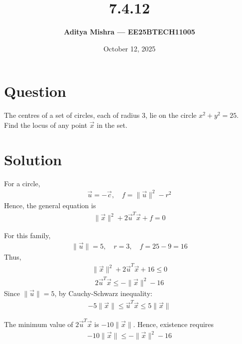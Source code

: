 \documentclass[a4paper,12pt]{article}
\title{\textbf{7.4.12}}
\author{\textbf{Aditya Mishra — EE25BTECH11005}}
\date{October 12, 2025}
\begin{document}
\maketitle

\section*{Question}
The centres of a set of circles, each of radius \(3\), lie on the circle \(x^2 + y^2 = 25\).  
Find the locus of any point \(\vec{x}\) in the set.

\section*{Solution}

For a circle,
\begin{align}
\vec{u} = -\vec{c}, \quad f = \|\vec{u}\|^2 - r^2
\end{align}
Hence, the general equation is
\begin{align}
\|\vec{x}\|^2 + 2\vec{u}^T\vec{x} + f = 0
\end{align}

For this family,
\begin{align}
\|\vec{u}\| = 5, \quad r = 3, \quad f = 25 - 9 = 16
\end{align}
Thus,
\begin{align}
\|\vec{x}\|^2 + 2\vec{u}^T\vec{x} + 16 \le 0
\end{align}
\begin{align}
2\vec{u}^T\vec{x} \le -\|\vec{x}\|^2 - 16
\end{align}
Since \(\|\vec{u}\| = 5\), by Cauchy-Schwarz inequality:
\begin{align}
-5\|\vec{x}\| \le \vec{u}^T\vec{x} \le 5\|\vec{x}\|
\end{align}

The minimum value of \(2\vec{u}^T\vec{x}\) is \(-10\|\vec{x}\|\).  
Hence, existence requires
\begin{align}
-10\|\vec{x}\| \le -\|\vec{x}\|^2 - 16
\end{align}
\end{document}
